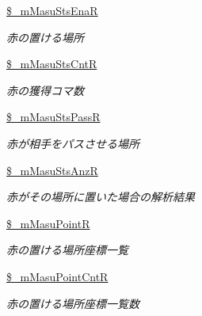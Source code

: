 \begin{DoxyCompactItemize}
\mbox{\label{class_reversi_add672fd9b0fd19e1602bc5d4bb9b0d88}} 
\hyperlink{class_reversi_add672fd9b0fd19e1602bc5d4bb9b0d88}{\$\+\_\+m\+Masu\+Sts\+EnaR}
\begin{DoxyCompactList}\small\item\em 赤の置ける場所 \end{DoxyCompactList}\item 
\mbox{\label{class_reversi_a8ebfe1e25ad504b7655c01828631a155}} 
\hyperlink{class_reversi_a8ebfe1e25ad504b7655c01828631a155}{\$\+\_\+m\+Masu\+Sts\+CntR}
\begin{DoxyCompactList}\small\item\em 赤の獲得コマ数 \end{DoxyCompactList}\item 
\mbox{\label{class_reversi_ad409dead7b1f751bb9ba087ced8cadfc}} 
\hyperlink{class_reversi_ad409dead7b1f751bb9ba087ced8cadfc}{\$\+\_\+m\+Masu\+Sts\+PassR}
\begin{DoxyCompactList}\small\item\em 赤が相手をパスさせる場所 \end{DoxyCompactList}\item 
\mbox{\label{class_reversi_a63c3ec2a9250f18aeb3e881a5c8724b1}} 
\hyperlink{class_reversi_a63c3ec2a9250f18aeb3e881a5c8724b1}{\$\+\_\+m\+Masu\+Sts\+AnzR}
\begin{DoxyCompactList}\small\item\em 赤がその場所に置いた場合の解析結果 \end{DoxyCompactList}\item 
\mbox{\label{class_reversi_a99f18f7afe6e931d3e7925e23bf15918}} 
\hyperlink{class_reversi_a99f18f7afe6e931d3e7925e23bf15918}{\$\+\_\+m\+Masu\+PointR}
\begin{DoxyCompactList}\small\item\em 赤の置ける場所座標一覧 \end{DoxyCompactList}\item 
\mbox{\label{class_reversi_acca482f972640097ce9e343eacf4b35b}} 
\hyperlink{class_reversi_acca482f972640097ce9e343eacf4b35b}{\$\+\_\+m\+Masu\+Point\+CntR}
\begin{DoxyCompactList}\small\item\em 赤の置ける場所座標一覧数 \end{DoxyCompactList}\item 

\end{DoxyCompactItemize}
